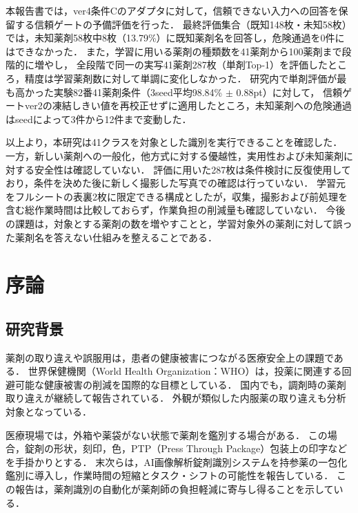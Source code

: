 \documentclass[uplatex,dvipdfmx]{jsarticle}
\begin{document}
本報告書では，ver4条件Cのアダプタに対して，信頼できない入力への回答を保留する信頼ゲートの予備評価を行った．
最終評価集合（既知148枚・未知58枚）では，未知薬剤58枚中8枚（13.79\%）に既知薬剤名を回答し，危険通過を0件にはできなかった．
また，学習に用いる薬剤の種類数を41薬剤から100薬剤まで段階的に増やし，
全段階で同一の実写41薬剤287枚（単剤Top-1）を評価したところ，精度は学習薬剤数に対して単調に変化しなかった．
研究内で単剤評価が最も高かった実験82番41薬剤条件（3seed平均98.84\% $\pm$ 0.88pt）に対して，
信頼ゲートver2の凍結しきい値を再校正せずに適用したところ，未知薬剤への危険通過はseedによって3件から12件まで変動した．

以上より，本研究は41クラスを対象とした識別を実行できることを確認した．
一方，新しい薬剤への一般化，他方式に対する優越性，実用性および未知薬剤に対する安全性は確認していない．
評価に用いた287枚は条件検討に反復使用しており，条件を決めた後に新しく撮影した写真での確認は行っていない．
学習元をフルシートの表裏2枚に限定できる構成としたが，収集，撮影および前処理を含む総作業時間は比較しておらず，作業負担の削減量も確認していない．
今後の課題は，対象とする薬剤の数を増やすことと，学習対象外の薬剤に対して誤った薬剤名を答えない仕組みを整えることである．
\newpage

{\small
\tableofcontents
}
\clearpage
\setcounter{page}{1}
\pagestyle{plain}

\section{序論}

\subsection{研究背景}

薬剤の取り違えや誤服用は，患者の健康被害につながる医療安全上の課題である．
世界保健機関（World Health Organization：WHO）は，投薬に関連する回避可能な健康被害の削減を国際的な目標としている\cite{who_medication}．
国内でも，調剤時の薬剤取り違えが継続して報告されている\cite{jcqhc_hiyari}．
外観が類似した内服薬の取り違えも分析対象となっている\cite{jcqhc_similarity}．

医療現場では，外箱や薬袋がない状態で薬剤を鑑別する場合がある．
この場合，錠剤の形状，刻印，色，PTP（Press Through Package）包装上の印字などを手掛かりとする．
末次らは，AI画像解析錠剤識別システムを持参薬の一包化鑑別に導入し，作業時間の短縮とタスク・シフトの可能性を報告している\cite{suetsugu2026ai}．
この報告は，薬剤識別の自動化が薬剤師の負担軽減に寄与し得ることを示している．
\end{document}
